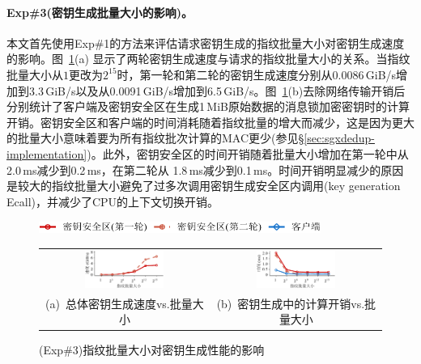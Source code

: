\paragraph*{Exp\#3(密钥生成批量大小的影响)。}

本文首先使用Exp\#1的方法来评估请求密钥生成的指纹批量大小对密钥生成速度的影响。图~\ref{fig:sgxdedup-exp-keygen-breakdown}(a) 显示了两轮密钥生成速度与请求的指纹批量大小的关系。当指纹批量大小从$1$更改为$2^{15}$时，第一轮和第二轮的密钥生成速度分别从0.0086\,GiB/s增加到3.3\,GiB/s以及从0.0091\,GiB/s增加到6.5\,GiB/s。图~\ref{fig:sgxdedup-exp-keygen-breakdown}(b)去除网络传输开销后分别统计了客户端及密钥安全区在生成1\,MiB原始数据的消息锁加密密钥时的计算开销。密钥安全区和客户端的时间消耗随着指纹批量的增大而减少，这是因为更大的批量大小意味着要为所有指纹批次计算的MAC更少(参见\S\ref{sec:sgxdedup-implementation})。此外，密钥安全区的时间开销随着批量大小增加在第一轮中从2.0\,ms减少到0.2\,ms，在第二轮从 1.8\,ms减少到0.1\,ms。时间开销明显减少的原因是较大的指纹批量大小避免了过多次调用密钥生成安全区内调用(key generation Ecall)，并减少了CPU的上下文切换开销。

\begin{figure}[!htb]
  \centering
  \includegraphics[height=11pt]{pic/sgxdedup/plot/exp_a2/expa2_keyEnclaveBatchSize_legend.pdf}
  \begin{tabular}{@{\ }c@{\ }c}
    \includegraphics[width=0.49\textwidth]{pic/sgxdedup/plot/exp_a2/expa2_keyEnclaveBatchSize_Performance_overall.pdf} & 
    \includegraphics[width=0.49\textwidth]{pic/sgxdedup/plot/exp_a2/expa2_keyEnclaveBatchSize_Performance_1st.pdf}           \hspace{5pt} \\
    \mbox{\small (a) 总体密钥生成速度vs.批量大小}                                                                      & 
    \mbox{\small (b) 密钥生成中的计算开销vs.批量大小}
  \end{tabular}
  \caption{(Exp\#3)指纹批量大小对密钥生成性能的影响}
  \label{fig:sgxdedup-exp-keygen-breakdown}
\end{figure}



